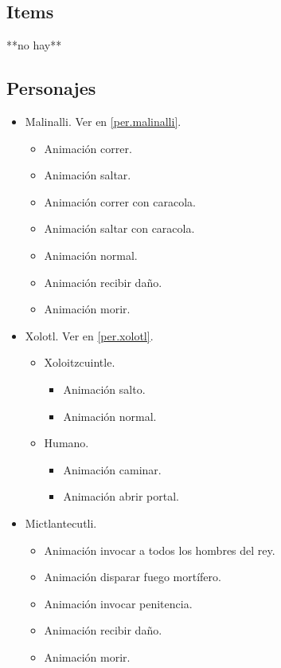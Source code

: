 	\subsection{Items}
	**no hay**
	\subsection{Personajes} 
	\begin{itemize}
		\item Malinalli. Ver en \ref{per.malinalli}.
		\begin{itemize}
			\item Animación correr.
			\item Animación saltar.
			\item Animación correr con caracola.
			\item Animación saltar con caracola.
			\item Animación normal.
			\item Animación recibir daño.
			\item Animación morir.
		\end{itemize}
		\item Xolotl. Ver en \ref{per.xolotl}.
		\begin{itemize}
			\item Xoloitzcuintle. 
				\begin{itemize}
					\item Animación salto.
					\item Animación normal.
				\end{itemize}
			\item Humano.
				\begin{itemize}
					\item Animación caminar.
					\item Animación abrir portal.  
				\end{itemize}
		\end{itemize}
		\item Mictlantecutli. 
		\begin{itemize}
			\item Animación invocar a todos los hombres del rey.
			\item Animación disparar fuego mortífero.
			\item Animación invocar penitencia.
			\item Animación recibir daño.
			\item Animación morir.
		\end{itemize}
	\end{itemize}
